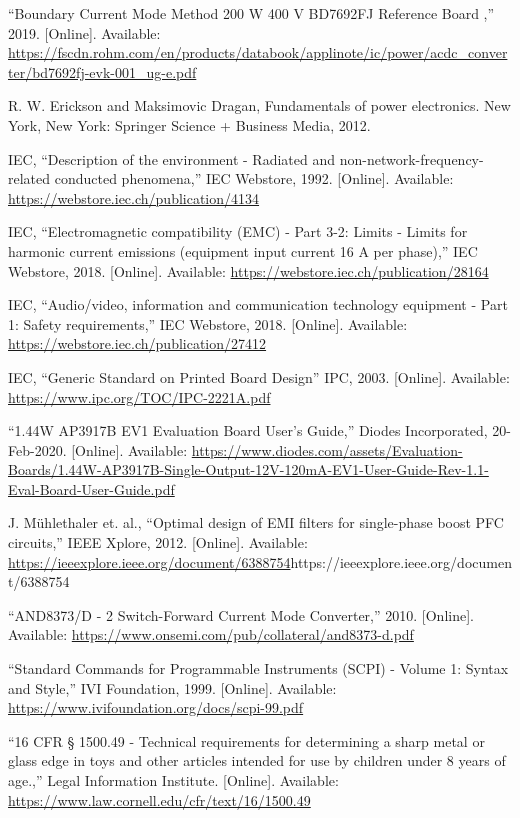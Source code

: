 \documentclass[12pt]{article}
\begin{document}
\begin{thebibliography}{9}
    “Boundary Current Mode Method 200 W 400 V BD7692FJ Reference Board ,” 2019. [Online]. Available: \url{https://fscdn.rohm.com/en/products/databook/applinote/ic/power/acdc_converter/bd7692fj-evk-001_ug-e.pdf}

    R. W. Erickson and Maksimovic Dragan, Fundamentals of power electronics. New York, New York: Springer Science + Business Media, 2012.

    IEC, “Description of the environment - Radiated and non-network-frequency-related conducted phenomena,” IEC Webstore, 1992. [Online]. Available: 
    \url{https://webstore.iec.ch/publication/4134}

    IEC, “Electromagnetic compatibility (EMC) - Part 3-2: Limits - Limits for harmonic current emissions (equipment input current 16 A per phase),” IEC Webstore, 2018. [Online]. Available:
    \url{https://webstore.iec.ch/publication/28164}

    IEC, “Audio/video, information and communication technology equipment - Part 1: Safety requirements,” IEC Webstore, 2018. [Online]. Available: 
    \url{https://webstore.iec.ch/publication/27412}

    IEC, “Generic Standard on Printed Board Design” IPC, 2003. [Online]. Available: \url{https://www.ipc.org/TOC/IPC-2221A.pdf}

    “1.44W AP3917B EV1 Evaluation Board User’s Guide,” Diodes Incorporated, 20-Feb-2020. [Online]. Available: \url{https://www.diodes.com/assets/Evaluation-Boards/1.44W-AP3917B-Single-Output-12V-120mA-EV1-User-Guide-Rev-1.1-Eval-Board-User-Guide.pdf}

    J. Mühlethaler et. al., “Optimal design of EMI filters for single-phase boost PFC circuits,” IEEE Xplore, 2012. [Online]. Available: 
    \url{https://ieeexplore.ieee.org/document/6388754}{https://ieeexplore.ieee.org/document/6388754}

    “AND8373/D - 2 Switch-Forward Current Mode Converter,” 2010. [Online]. Available: \url{https://www.onsemi.com/pub/collateral/and8373-d.pdf}

    “Standard Commands for Programmable Instruments (SCPI) - Volume 1: Syntax and Style,” IVI Foundation, 1999. [Online]. Available: \url{https://www.ivifoundation.org/docs/scpi-99.pdf}

    “16 CFR § 1500.49 - Technical requirements for determining a sharp metal or glass edge in toys and other articles intended for use by children under 8 years of age.,” Legal Information Institute. [Online]. Available: \url{https://www.law.cornell.edu/cfr/text/16/1500.49}
    

\end{thebibliography}
\end{document}
